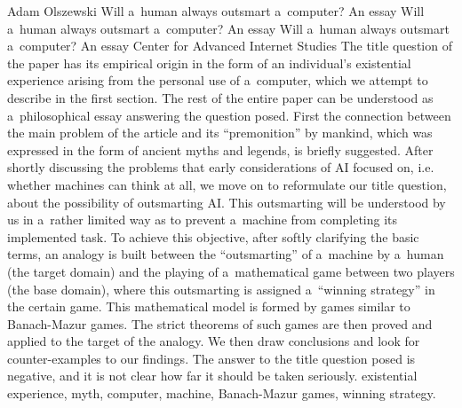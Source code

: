 \begin{artengenv}{Adam Olszewski}
	{Will a~human always outsmart a~computer? An essay}
	{Will a~human always outsmart a~computer? An essay}
	{Will a~human always outsmart a~computer? An essay}
	{Center for Advanced Internet Studies}
	{The title question of the paper has its empirical origin in the form of an individual's existential experience arising from the personal use of a~computer, which we attempt to describe in the first section. The rest of the entire paper can be understood as a~philosophical essay answering the question posed. First the connection between the main problem of the article and its ``premonition'' by mankind, which was expressed in the form of ancient myths and legends, is briefly suggested. After shortly discussing the problems that early considerations of AI focused on, i.e. whether machines can think at all, we move on to reformulate our title question, about the possibility of outsmarting AI. This outsmarting will be understood by us in a~rather limited way as to prevent a~machine from completing its implemented task. To achieve this objective, after softly clarifying the basic terms, an analogy is built between the ``outsmarting'' of a~machine by a~human (the target domain) and the playing of a~mathematical game between two players (the base domain), where this outsmarting is assigned a~``winning strategy'' in the certain game. This mathematical model is formed by games similar to Banach-Mazur games. The strict theorems of such games are then proved and applied to the target of the analogy. We then draw conclusions and look for counter-examples to our findings. The answer to the title question posed is negative, and it is not clear how far it should be taken seriously.
	}
	{existential experience, myth, computer, machine, Banach-Mazur games, winning strategy.}
	
	\setcounter{section}{-1}
	

\end{artengenv}
